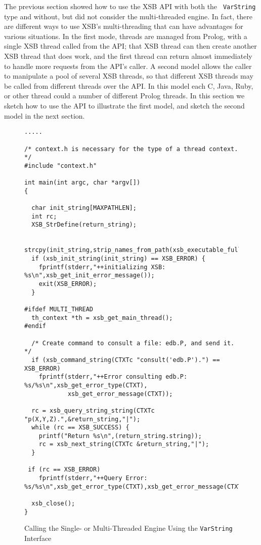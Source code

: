 The previous section showed how to use the XSB API with both the {\tt
  VarString} type and without, but did not consider the multi-threaded
engine.  In fact, there are different ways to use XSB's
multi-threading that can have advantages for various situations.  In
the first mode, threads are managed from Prolog, with a single XSB
thread called from the API; that XSB thread can then create another
XSB thread that does work, and the first thread can return almost
immediately to handle more requests from the API's caller.  A second
model allows the caller to manipulate a pool of several XSB threads,
so that different XSB threads may be called from different threads
over the API.  In this model each C, Java, Ruby, or other thread could
a number of different Prolog threads.  In this section we sketch how
to use the API to illustrate the first model, and sketch the second
model in the next section.

\begin{figure}[hbtp]
\begin{small}
\begin{verbatim}
.....

/* context.h is necessary for the type of a thread context. */
#include "context.h"

int main(int argc, char *argv[])
{ 

  char init_string[MAXPATHLEN];
  int rc;
  XSB_StrDefine(return_string);

  strcpy(init_string,strip_names_from_path(xsb_executable_full_path(argv[0]),3));
  if (xsb_init_string(init_string) == XSB_ERROR) {
    fprintf(stderr,"++initializing XSB: %s\n",xsb_get_init_error_message());
    exit(XSB_ERROR);
  }

#ifdef MULTI_THREAD
  th_context *th = xsb_get_main_thread();
#endif

  /* Create command to consult a file: edb.P, and send it. */
  if (xsb_command_string(CTXTc "consult('edb.P').") == XSB_ERROR)
    fprintf(stderr,"++Error consulting edb.P: %s/%s\n",xsb_get_error_type(CTXT),
            xsb_get_error_message(CTXT));

  rc = xsb_query_string_string(CTXTc "p(X,Y,Z).",&return_string,"|");
  while (rc == XSB_SUCCESS) {
    printf("Return %s\n",(return_string.string));
    rc = xsb_next_string(CTXTc &return_string,"|");
  }
 
 if (rc == XSB_ERROR) 
    fprintf(stderr,"++Query Error: %s/%s\n",xsb_get_error_type(CTXT),xsb_get_error_message(CTXT));

  xsb_close();     
}
\end{verbatim}
\end{small}
\caption{Calling the Single- or Multi-Threaded Engine Using the {\tt VarString} Interface} 
\label{fig:varstringex1}
\end{figure}

